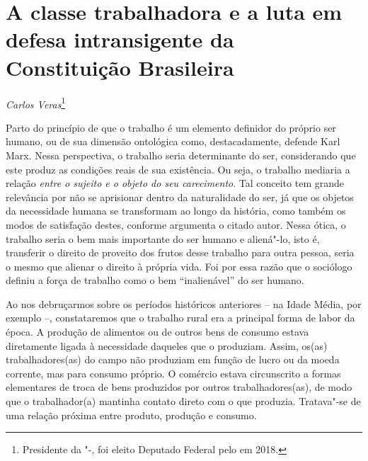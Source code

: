 \chapter*{A classe trabalhadora e a luta em defesa intransigente da
Constituição Brasileira}


\begin{flushright}
\emph{Carlos Veras}\footnote{Presidente da "-, foi eleito
Deputado Federal pelo  em 2018.}
\end{flushright}

Parto do princípio de que o trabalho é um elemento definidor do próprio
ser humano, ou de sua dimensão ontológica como, destacadamente, defende
Karl Marx. Nessa perspectiva, o trabalho seria determinante do ser,
considerando que este produz as condições reais de sua existência. Ou
seja, o trabalho mediaria a relação \emph{entre o sujeito e o objeto do
seu carecimento}. Tal conceito tem grande relevância por não se
aprisionar dentro da naturalidade do ser, já que os objetos da necessidade humana
se transformam ao longo
da história, como também os modos de
satisfação destes, conforme argumenta o citado autor. Nessa ótica, o
trabalho seria o bem mais importante do ser humano e aliená"-lo, isto é,
transferir o direito de proveito dos frutos desse trabalho para outra
pessoa, seria o mesmo que alienar o direito à própria vida. Foi por essa
razão que o sociólogo definiu a força de trabalho como o bem
``inalienável'' do ser humano.

Ao nos debruçarmos sobre os períodos históricos anteriores -- na Idade
Média, por exemplo --, constataremos que o trabalho rural era a
principal forma de labor da época. A produção de alimentos ou de outros
bens de consumo estava diretamente ligada à necessidade daqueles que o
produziam. Assim, os(as) trabalhadores(as) do campo não produziam em
função de lucro ou da moeda corrente, mas para consumo próprio. O
comércio estava circunscrito a formas elementares de troca de bens
produzidos por outros trabalhadores(as), de modo que o trabalhador(a)
mantinha contato direto com o que produzia. Tratava"-se de uma relação
próxima entre produto, produção e consumo.


